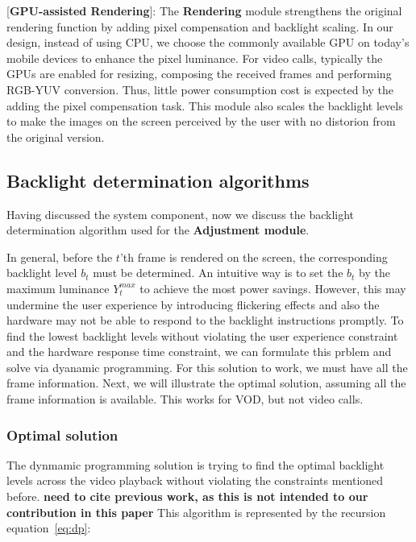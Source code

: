 [{\bf GPU-assisted Rendering}]:
The {\bf Rendering} module strengthens the original rendering function by
adding pixel compensation and backlight scaling.  In our design,
instead of using CPU, we choose the commonly available GPU on today's
mobile devices to enhance the pixel luminance.  For video calls,
typically the GPUs are enabled for resizing, composing the received
frames and performing RGB-YUV conversion. Thus,  little power consumption
cost is expected by the adding the pixel compensation task. This
module also scales the backlight levels to make the images on the
screen perceived by the user with no distorion from the original
version.

\subsection{Backlight determination algorithms}
Having discussed the system component, now we discuss the backlight
determination algorithm used for the {\bf Adjustment module}.

In general, before the $t$'th frame is rendered on the screen, the corresponding
backlight level $b_t$ must be determined. An intuitive way is to set
the $b_t$ by the maximum luminance $Y_{t}^{max}$ to achieve the most
power savings. However, this may undermine the user experience by
introducing flickering effects and also the hardware may not be able
to respond to the backlight instructions promptly.  To find the lowest
backlight levels without violating the user experience constraint and
the hardware response time constraint, we can formulate this prblem
and solve via dyanamic programming.  For this solution to work, we
must have all the frame information.
Next, we will illustrate the optimal solution, assuming all the frame
information is available. This works for VOD, but not video calls. 


\subsubsection{Optimal solution}
The dynmamic programming solution is trying to find the optimal
backlight levels across the video playback without violating the
constraints mentioned before. {\bf need to cite previous work, as this
is not intended to our contribution in this paper}
This algorithm is represented by the
recursion equation~\ref{eq:dp}:

